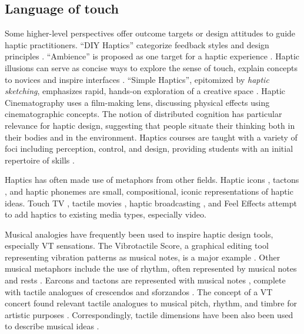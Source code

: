 \subsection{Language of touch }
Some higher-level perspectives offer outcome targets or design attitudes to guide haptic practitioners.
``DIY Haptics'' categorize  feedback styles and design principles \cite{Hayward2007,MacLean2008}.
``Ambience'' is proposed as one target for a haptic experience \cite{MacLean2009}.
Haptic illusions can serve as concise ways to explore the sense of touch, explain concepts to novices and inspire interfaces \cite{Hayward2008}.
``Simple Haptics'', epitomized by \emph{haptic sketching}, emphasizes rapid, hands-on exploration of a creative space \cite{Moussette2010,Moussette2011}. %
Haptic Cinematography \cite{Danieau2014} uses a film-making lens, discussing physical effects using cinematographic concepts.
The notion of distributed cognition \cite{Hutchins1995} has particular relevance for haptic design, %
suggesting that people situate their thinking both in their bodies and in the environment.
Haptics courses are taught with a variety of foci including perception, control, and design, providing students with an initial repertoire of skills \cite{Okamura2012, Jones2014}.

Haptics has often made use of metaphors from other fields.
Haptic icons  \cite{MacLean2003}, tactons \cite{Brewster2004}, and haptic phonemes \cite{Enriquez2006} are small, compositional, iconic representations of haptic ideas.
Touch TV \cite{Modhrain2001},  tactile movies \cite{Kim2009}, haptic broadcasting \cite{Cha2009}, and Feel Effects \cite{Israr2014} attempt to add haptics to existing media types, especially video.

Musical analogies have frequently been used to inspire haptic design tools, especially VT sensations. %
The Vibrotactile Score, a graphical editing tool representing vibration patterns as musical notes, is a major example \cite{Lee2012, Lee2009}.
Other musical metaphors include the use of rhythm, often represented by musical notes and rests \cite{Ternes2008,Brown2005,Chan2008, Brown2006a}.
Earcons and tactons are represented with musical notes \cite{Brewster1993,Brewster2004}, complete with
tactile analogues of crescendos and sforzandos \cite{Brown2006}.
The concept of a VT concert found relevant tactile analogues to musical pitch, rhythm, and timbre for artistic purposes \cite{Gunther2002}.
Correspondingly, tactile dimensions have been also been used to describe musical ideas \cite{Eitan2010}.


